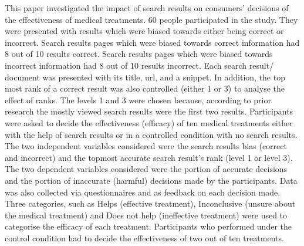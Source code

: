 \documentclass[]{article}
\begin{document}
This paper investigated the impact of search results on consumers' decisions of the effectiveness of medical treatments. 60 people participated in the study. They were presented with results which were biased towards either being correct or incorrect. Search results pages which were biased towards correct information had 8 out of 10 results correct. Search results pages which were biased towards incorrect information had 8 out of 10 results incorrect. Each search result/ document was presented with its title, url, and a snippet. In addition, the top most rank of a correct result was also controlled (either 1 or 3) to analyse the effect of ranks. The levels 1 and 3 were chosen because, according to prior research the mostly viewed search results were the first two results. Participants were asked to decide the effectiveness (efficacy) of ten medical treatments either with the help of search results or in a controlled condition with no search results. The two independent variables considered were the search results bias (correct and incorrect) and the topmost accurate search result's rank (level 1 or level 3). The two dependent variables considered were the portion of accurate decisions and the portion of inaccurate (harmful) decisions made by the participants. Data was also collected via questionnaires and as feedback on each decision made. Three categories, such as Helps (effective treatment), Inconclusive (unsure about the medical treatment) and Does not help (ineffective treatment) were used to categorise the efficacy of each treatment. Participants who performed under the control condition had to decide the effectiveness of two out of ten treatments. 
\end{document}
